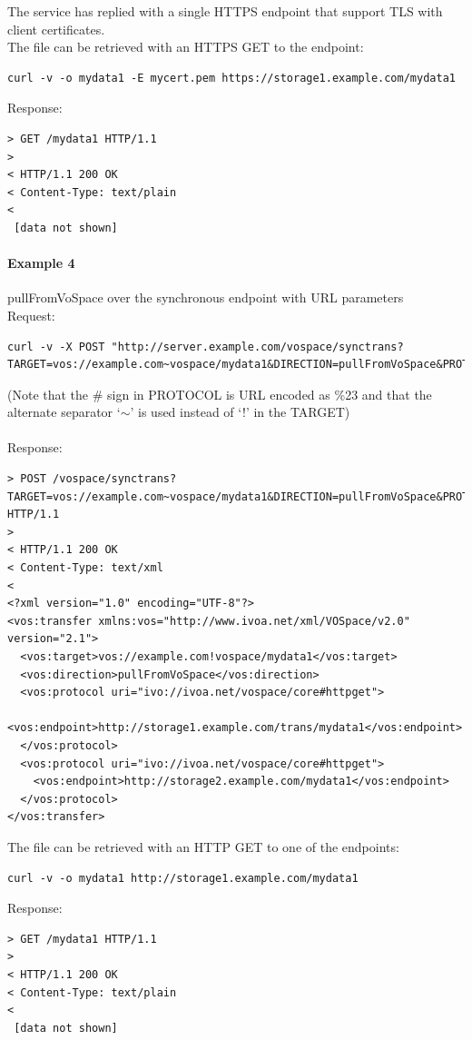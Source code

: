 \documentclass[11pt,a4paper]{ivoa}
\begin{document}
The service has replied with a single HTTPS endpoint that support TLS with client certificates.\\
The file can be retrieved with an HTTPS GET to the endpoint:
\begin{lstlisting}
curl -v -o mydata1 -E mycert.pem https://storage1.example.com/mydata1
\end{lstlisting}
Response:
\begin{lstlisting}
> GET /mydata1 HTTP/1.1
>
< HTTP/1.1 200 OK
< Content-Type: text/plain
<
 [data not shown]
\end{lstlisting}

\paragraph{Example 4}
pullFromVoSpace over the synchronous endpoint with URL parameters
\\[5px]
\noindent
Request:
\begin{lstlisting}
curl -v -X POST "http://server.example.com/vospace/synctrans?TARGET=vos://example.com~vospace/mydata1&DIRECTION=pullFromVoSpace&PROTOCOL=ivo://ivoa.net/vospace/core%23httpget"
\end{lstlisting}
(Note that the \# sign in PROTOCOL is URL encoded as \%23 and that the alternate separator `$\mathtt{\sim}$' is used instead of `!' in the TARGET) \\
\\
Response:
\begin{lstlisting}
> POST /vospace/synctrans?TARGET=vos://example.com~vospace/mydata1&DIRECTION=pullFromVoSpace&PROTOCOL=ivo://ivoa.net/vospace/core\%23httpget HTTP/1.1
>
< HTTP/1.1 200 OK
< Content-Type: text/xml
<
<?xml version="1.0" encoding="UTF-8"?>
<vos:transfer xmlns:vos="http://www.ivoa.net/xml/VOSpace/v2.0" version="2.1">
  <vos:target>vos://example.com!vospace/mydata1</vos:target>
  <vos:direction>pullFromVoSpace</vos:direction>
  <vos:protocol uri="ivo://ivoa.net/vospace/core#httpget">
    <vos:endpoint>http://storage1.example.com/trans/mydata1</vos:endpoint>
  </vos:protocol>
  <vos:protocol uri="ivo://ivoa.net/vospace/core#httpget">
    <vos:endpoint>http://storage2.example.com/mydata1</vos:endpoint>
  </vos:protocol>
</vos:transfer>
\end{lstlisting}
The file can be retrieved with an HTTP GET to one of the endpoints:
\begin{lstlisting}
curl -v -o mydata1 http://storage1.example.com/mydata1
\end{lstlisting}
Response:
\begin{lstlisting}
> GET /mydata1 HTTP/1.1
>
< HTTP/1.1 200 OK
< Content-Type: text/plain
<
 [data not shown]
 \end{lstlisting}
\end{document}
